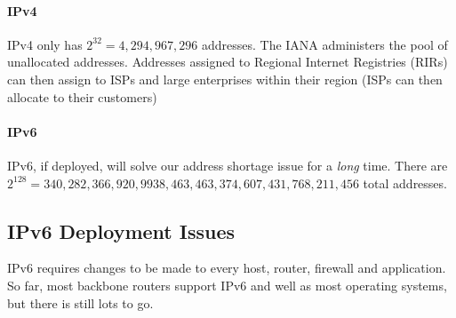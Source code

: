 \paragraph{IPv4}\label{par:ipv4}

IPv4 only has \(2^{32}=4,294,967,296\) addresses.
The IANA administers the pool of unallocated addresses.
Addresses assigned to Regional Internet Registries (RIRs) can then assign to ISPs and large enterprises within their region (ISPs can then allocate to their customers)

\paragraph{IPv6}\label{par:ipv6}

IPv6, if deployed, will solve our address shortage issue for a \emph{long} time.
There are \(2^{128}=340,282,366,920,9938,463,463,374,607,431,768,211,456\) total addresses.

\subsection{IPv6 Deployment Issues}\label{sub:ipv6_deployment_issues}

IPv6 requires changes to be made to every host, router, firewall and application.
So far, most backbone routers support IPv6 and well as most operating systems, but there is still lots to go.


